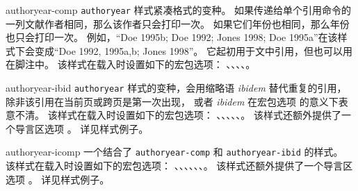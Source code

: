\begin{marglist}
\item[authoryear-comp]
\texttt{authoryear} 样式紧凑格式的变种。
如果传递给单个引用命令的一列文献作者相同，那么该作者只会打印一次。
如果它们年份也相同，那么年份也只会打印一次。
例如，“Doe 1995b; Doe 1992; Jones 1998; Doe 1995a”在该样式下会变成“Doe 1992, 1995a,b; Jones 1998”。
它起初用于文中引用，但也可以用在脚注中。
该样式在载入时设置如下的宏包选项：
、、、、。

\item[authoryear-ibid]
\texttt{authoryear} 样式的变种，会用缩略语 \emph{ibidem} 替代重复的引用，
除非该引用在当前页或跨页是第一次出现，
或者 \emph{ibidem} 在宏包选项  的意义下表意不清。
该样式在载入时设置如下的宏包选项：
、、、、、。
该样式还额外提供了一个导言区选项 。
详见样式例子。

\item[authoryear-icomp]
一个结合了 \texttt{authoryear-comp} 和 \texttt{authoryear-ibid} 的样式。
该样式在载入时设置如下的宏包选项：
、、、、、、。
该样式还额外提供了一个导言区选项 。
详见样式例子。


\end{marglist}
